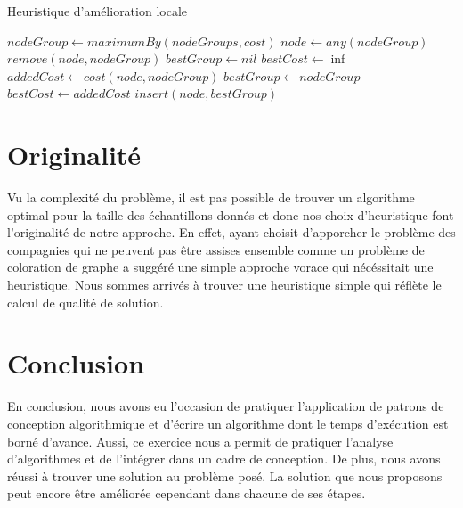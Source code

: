 \documentclass[letterpaper,12pt,final]{article}
\begin{document}
\begin{algorithm}
  \caption{Heuristique d'amélioration locale}
  \label{alg:heur}
  \begin{algorithmic}[1]
    \State $nodeGroup \gets maximumBy(nodeGroups, cost)$
    \State $node \gets any(nodeGroup)$
    \State $remove(node, nodeGroup)$ 
    \State $bestGroup \gets nil$
    \State $bestCost \gets \inf$
    \State $addedCost \gets cost(node, nodeGroup)$
    \State $bestGroup \gets nodeGroup$
    \State $bestCost \gets addedCost$
    \EndIf
    \EndIf
    \EndFor
    \State $insert(node, bestGroup)$ 
    \EndWhile
  \end{algorithmic}
\end{algorithm}

\section{Originalité}

Vu la complexité du problème, il est pas possible de trouver un
algorithme optimal pour la taille des échantillons donnés et donc nos
choix d'heuristique font l'originalité de notre approche. En effet,
ayant choisit d'apporcher le problème des compagnies qui ne peuvent
pas être assises ensemble comme un problème de coloration de graphe a
suggéré une simple approche vorace qui nécéssitait une
heuristique. Nous sommes arrivés à trouver une heuristique simple qui
réflète le calcul de qualité de solution.

\section{Conclusion}

En conclusion, nous avons eu l'occasion de pratiquer l'application de
patrons de conception algorithmique et d'écrire un algorithme dont le
temps d'exécution est borné d'avance.  Aussi, ce exercice nous a
permit de pratiquer l'analyse d'algorithmes et de l'intégrer dans un
cadre de conception.  De plus, nous avons réussi à trouver une
solution au problème posé.  La solution que nous proposons peut encore
être améliorée cependant dans chacune de ses étapes.

\clearpage
%
\end{document}
